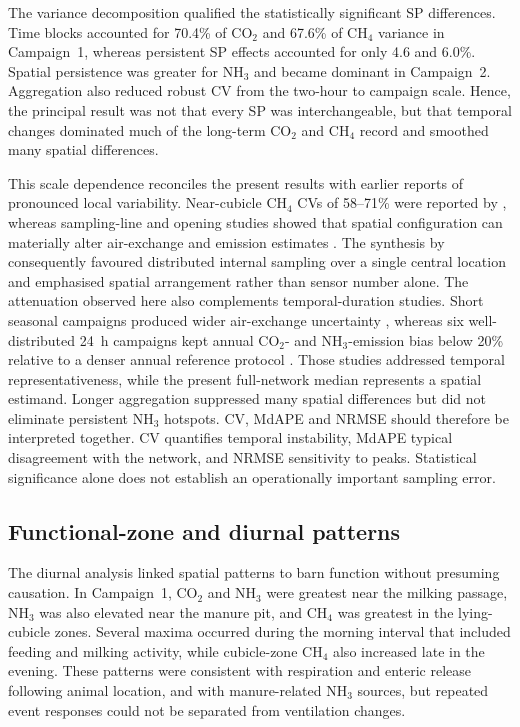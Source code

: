 \documentclass[12pt,a4paper]{article}
\begin{document}
The variance decomposition qualified the statistically significant SP differences. Time blocks accounted for 70.4\% of \(\mathrm{CO_2}\) and 67.6\% of \(\mathrm{CH_4}\) variance in Campaign~1, whereas persistent SP effects accounted for only 4.6 and 6.0\%. Spatial persistence was greater for \(\mathrm{NH_3}\) and became dominant in Campaign~2. Aggregation also reduced robust CV from the two-hour to campaign scale. Hence, the principal result was not that every SP was interchangeable, but that temporal changes dominated much of the long-term \(\mathrm{CO_2}\) and \(\mathrm{CH_4}\) record and smoothed many spatial differences.

This scale dependence reconciles the present results with earlier reports of pronounced local variability. Near-cubicle \(\mathrm{CH_4}\) CVs of 58--71\% were reported by \citet{Wu2016}, whereas sampling-line and opening studies showed that spatial configuration can materially alter air-exchange and emission estimates \citep{JankeSampling2020,Saha2013}. The synthesis by \citet{Apostolico2026} consequently favoured distributed internal sampling over a single central location and emphasised spatial arrangement rather than sensor number alone. The attenuation observed here also complements temporal-duration studies. Short seasonal campaigns produced wider air-exchange uncertainty \citep{Koenig2018}, whereas six well-distributed \SI{24}{h} campaigns kept annual \(\mathrm{CO_2}\)- and \(\mathrm{NH_3}\)-emission bias below 20\% relative to a denser annual reference protocol \citep{Kafle2018}. Those studies addressed temporal representativeness, while the present full-network median represents a spatial estimand. Longer aggregation suppressed many spatial differences but did not eliminate persistent \(\mathrm{NH_3}\) hotspots. CV, MdAPE and NRMSE should therefore be interpreted together. CV quantifies temporal instability, MdAPE typical disagreement with the network, and NRMSE sensitivity to peaks. Statistical significance alone does not establish an operationally important sampling error.

\subsection{Functional-zone and diurnal patterns}

The diurnal analysis linked spatial patterns to barn function without presuming causation. In Campaign~1, \(\mathrm{CO_2}\) and \(\mathrm{NH_3}\) were greatest near the milking passage, \(\mathrm{NH_3}\) was also elevated near the manure pit, and \(\mathrm{CH_4}\) was greatest in the lying-cubicle zones. Several maxima occurred during the morning interval that included feeding and milking activity, while cubicle-zone \(\mathrm{CH_4}\) also increased late in the evening. These patterns were consistent with respiration and enteric release following animal location, and with manure-related \(\mathrm{NH_3}\) sources, but repeated event responses could not be separated from ventilation changes.
\end{document}
